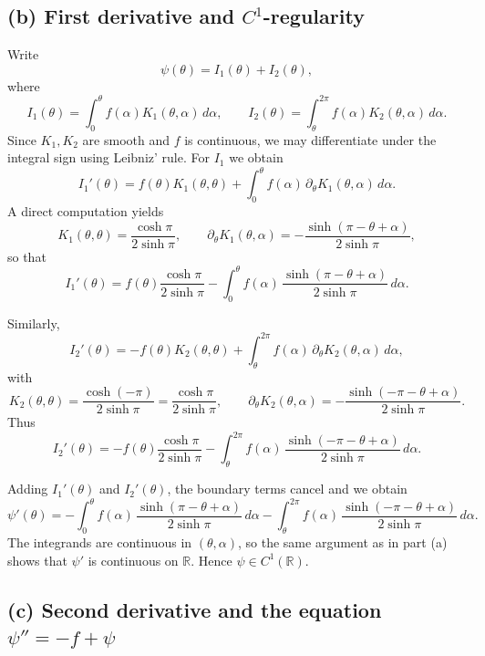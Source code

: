 \documentclass[12pt,a4paper]{article}
\theoremstyle{plain}
\theoremstyle{definition}
\theoremstyle{remark}
\theoremstyle{remark}
\begin{document}
\subsection*{(b) First derivative and $C^1$-regularity}

Write
\[
\psi(\theta)=I_1(\theta)+I_2(\theta),
\]
where
\[
I_1(\theta)=\int_0^\theta f(\alpha)K_1(\theta,\alpha)\,d\alpha,
\qquad
I_2(\theta)=\int_\theta^{2\pi} f(\alpha)K_2(\theta,\alpha)\,d\alpha.
\]
Since $K_1,K_2$ are smooth and $f$ is continuous, we may differentiate
under the integral sign using Leibniz' rule. For $I_1$ we obtain
\[
I_1'(\theta)
= f(\theta)K_1(\theta,\theta)
+ \int_0^\theta f(\alpha)\,\partial_\theta K_1(\theta,\alpha)\,d\alpha.
\]
A direct computation yields
\[
K_1(\theta,\theta)=\frac{\cosh\pi}{2\sinh\pi},\qquad
\partial_\theta K_1(\theta,\alpha)
= -\frac{\sinh(\pi-\theta+\alpha)}{2\sinh\pi},
\]
so that
\[
I_1'(\theta)
= f(\theta)\frac{\cosh\pi}{2\sinh\pi}
-\int_0^\theta f(\alpha)\,
\frac{\sinh(\pi-\theta+\alpha)}{2\sinh\pi}\,d\alpha.
\]

Similarly,
\[
I_2'(\theta)
= -f(\theta)K_2(\theta,\theta)
+ \int_\theta^{2\pi}f(\alpha)\,\partial_\theta K_2(\theta,\alpha)\,d\alpha,
\]
with
\[
K_2(\theta,\theta)=\frac{\cosh(-\pi)}{2\sinh\pi}
=\frac{\cosh\pi}{2\sinh\pi},
\qquad
\partial_\theta K_2(\theta,\alpha)
= -\frac{\sinh(-\pi-\theta+\alpha)}{2\sinh\pi}.
\]
Thus
\[
I_2'(\theta)
= -f(\theta)\frac{\cosh\pi}{2\sinh\pi}
-\int_\theta^{2\pi} f(\alpha)\,
\frac{\sinh(-\pi-\theta+\alpha)}{2\sinh\pi}\,d\alpha.
\]

Adding $I_1'(\theta)$ and $I_2'(\theta)$, the boundary terms cancel and we
obtain
\[
\psi'(\theta)
= -\int_0^\theta f(\alpha)\,
\frac{\sinh(\pi-\theta+\alpha)}{2\sinh\pi}\,d\alpha
-\int_\theta^{2\pi} f(\alpha)\,
\frac{\sinh(-\pi-\theta+\alpha)}{2\sinh\pi}\,d\alpha.
\]
The integrands are continuous in $(\theta,\alpha)$, so the same argument as
in part (a) shows that $\psi'$ is continuous on $\mathbb{R}$. Hence
$\psi\in C^1(\mathbb{R})$.

\subsection*{(c) Second derivative and the equation $\psi''=-f+\psi$}
\end{document}
